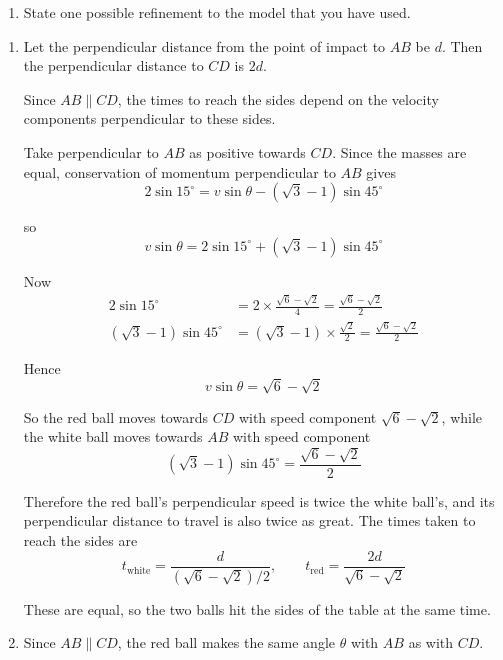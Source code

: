 \documentclass[leqno]{article}
\begin{document}
\begin{enumerate}[
  label=\textbf{\arabic*.},
  leftmargin=*,
  topsep=0pt,
  partopsep=0pt,
  parsep=0pt
]
\begin{enumerate}[label=\textbf{(\alph*)}]
  Fully justify your answer.  \\
  \item State one possible refinement to the model that you have used.  \\
\end{enumerate}

\vspace*{10pt}

\begin{djsSolution}
\begin{enumerate}[label=\textbf{(\alph*)}]
  \item Let the perpendicular distance from the point of impact to $AB$ be $d$.  
  Then the perpendicular distance to $CD$ is $2d$.

  Since $AB \parallel CD$, the times to reach the sides depend on the velocity components perpendicular to these sides.

  Take perpendicular to $AB$ as positive towards $CD$. Since the masses are equal, conservation of momentum perpendicular to $AB$ gives
  \[
  2\sin 15^\circ = v\sin\theta - (\sqrt3-1)\sin45^\circ
  \]

  so
  \[
  v\sin\theta = 2\sin15^\circ + (\sqrt3-1)\sin45^\circ
  \]

  Now
  \begin{align*}
  2\sin15^\circ &= 2\times \frac{\sqrt6-\sqrt2}{4}
  = \frac{\sqrt6-\sqrt2}{2} \\
  (\sqrt3-1)\sin45^\circ &= (\sqrt3-1)\times \frac{\sqrt2}{2}
  = \frac{\sqrt6-\sqrt2}{2}
  \end{align*}

  Hence
  \[
  v\sin\theta = \sqrt6-\sqrt2
  \]

  So the red ball moves towards $CD$ with speed component $\sqrt6-\sqrt2$, while the white ball moves towards $AB$ with speed component
  \[
  (\sqrt3-1)\sin45^\circ = \frac{\sqrt6-\sqrt2}{2}
  \]

  Therefore the red ball's perpendicular speed is twice the white ball's, and its perpendicular distance to travel is also twice as great. The times taken to reach the sides are
  \[
  t_{\text{white}}=\frac{d}{(\sqrt6-\sqrt2)/2},
  \qquad
  t_{\text{red}}=\frac{2d}{\sqrt6-\sqrt2}
  \]

  These are equal, so the two balls hit the sides of the table at the same time.

  \item Since $AB \parallel CD$, the red ball makes the same angle $\theta$ with $AB$ as with $CD$.


\end{enumerate}
\end{djsSolution}
\end{enumerate}
\end{document}
